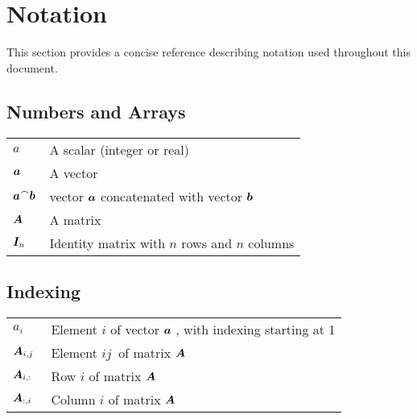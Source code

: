 \chapter*{Notation}\label{notation}

This section provides a concise reference describing notation used throughout this document.

\section*{Numbers and Arrays}
\bgroup{}
\begin{tabular}{>{\centering}p{1.2in}p{3.5in}}
  \(\displaystyle a~\) & A scalar (integer or real) \\
  \(\displaystyle {\bm{a}}~\) & A vector\\
  \(\displaystyle {\bm{a}}^\frown{\bm{b}}\) & vector \({\bm{a}}\) concatenated with vector \({\bm{b}}\)\\
  \(\displaystyle {\bm{A}}~\) & A matrix\\
  \(\displaystyle {\bm{I}}_n~\) & Identity matrix with  \(n\) rows and  \(n\) columns\\
\end{tabular}

\egroup{}

\section*{Indexing}
\bgroup{}
\begin{tabular}{>{\centering}p{1.2in}p{4in}}
  \(\displaystyle a_i~\) & Element  \(i\) of vector  \({\bm{a}}~\), with indexing starting at 1 \\
  \(\displaystyle {\bm{A}}_{i,j}~\) & Element  \(i j~\) of matrix  \({\bm{A}}~\) \\
  \(\displaystyle {\bm{A}}_{i, :}~\) & Row  \(i\) of matrix  \({\bm{A}}~\) \\
  \(\displaystyle {\bm{A}}_{:, i}~\) & Column  \(i\) of matrix  \({\bm{A}}~\) \\
\end{tabular}
\egroup{}


